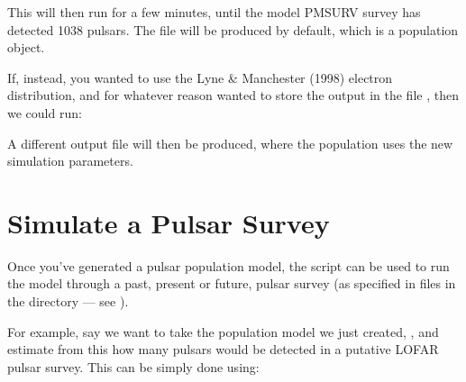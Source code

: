 \documentclass[letterpaper,10pt,english]{sphinxmanual}
\begin{document}
\begin{sphinxVerbatim}[commandchars=\\\{\}]
    
\end{sphinxVerbatim}

\sphinxAtStartPar
This will then run for a few minutes, until the model PMSURV survey
has detected 1038 pulsars. The file  will be produced
by default, which is a 
population object.

\sphinxAtStartPar
If, instead, you wanted to use the Lyne \& Manchester (1998) electron
distribution, and for whatever reason wanted to store the output in the
file , then we could run:

\begin{sphinxVerbatim}[commandchars=\\\{\}]
        
\end{sphinxVerbatim}

\sphinxAtStartPar
A different output file will then be produced, where the population uses
the new simulation parameters.


\section{Simulate a Pulsar Survey}
\label{\detokenize{tutorial-basic:simulate-a-pulsar-survey}}\label{\detokenize{tutorial-basic:simulate-survey}}
\sphinxAtStartPar
Once you’ve generated a pulsar population model, the  script
can be used to run the model through a past, present or future, pulsar
survey (as specified in files in the  directory — see
).

\sphinxAtStartPar
For example, say we want to take the population model we just created,
, and estimate from this how many pulsars would be detected
in a putative LOFAR pulsar survey. This can be simply done using:

\begin{sphinxVerbatim}[commandchars=\\\{\}]
    
\end{sphinxVerbatim}
\end{document}
